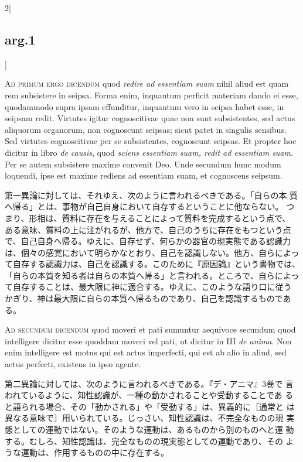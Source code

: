 \documentclass[paper=a4paper,fontsize=10pt,jafontsize=9pt,titlepage]{jlreq}
\begin{document}
\begin{paracol}{2}[\subsection{arg.1}]
\switchcolumn*[\subsection{ad.1}]

{\scshape Ad primum ergo dicendum} quod {\itshape redire ad essentiam
suam} nihil aliud est quam rem subsistere in seipsa. Forma enim,
inquantum perficit materiam dando ei esse, quodammodo supra ipsam
effunditur, inquantum vero in seipsa habet esse, in seipsam
redit. Virtutes igitur cognoscitivae quae non sunt subsistentes, sed
actus aliquorum organorum, non cognoscunt seipsas; sicut patet in
singulis sensibus. Sed virtutes cognoscitivae per se subsistentes,
cognoscunt seipsas. Et propter hoc dicitur in libro {\itshape de
causis}, quod {\itshape sciens essentiam suam, redit ad essentiam
suam}. Per se autem subsistere maxime convenit Deo. Unde secundum hunc
modum loquendi, ipse est maxime rediens ad essentiam suam, et
cognoscens seipsum.

\switchcolumn

第一異論に対しては、それゆえ、次のように言われるべきである。「自らの本
質へ帰る」とは、事物が自己自身において自存するということに他ならない。
つまり、形相は、質料に存在を与えることによって質料を完成するという点で、
ある意味、質料の上に注がれるが、他方で、自己のうちに存在をもつという点
で、自己自身へ帰る。ゆえに、自存せず、何らかの器官の現実態である認識力
は、個々の感覚において明らかなとおり、自己を認識しない。他方、自らによっ
て自存する認識力は、自己を認識する。このために『原因論』という書物では、
「自らの本質を知る者は自らの本質へ帰る」と言われる。ところで、自らによっ
て自存することは、最大限に神に適合する。ゆえに、このような語り口に従う
かぎり、神は最大限に自らの本質へ帰るものであり、自己を認識するものであ
る。

\switchcolumn*[\subsection{ad.2}]

{\scshape Ad secundum dicendum} quod moveri et pati sumuntur aequivoce
secundum quod intelligere dicitur esse quoddam moveri vel pati, ut
dicitur in III {\itshape de anima}. Non enim intelligere est motus qui
est actus imperfecti, qui est ab alio in aliud, sed actus perfecti,
existens in ipso agente.

\switchcolumn

第二異論に対しては、次のように言われるべきである。『デ・アニマ』3巻で
言われているように、知性認識が、一種の動かされることや受動することであ
ると語られる場合、その「動かされる」や「受動する」は、異義的に［通常と
は異なる意味で］用いられている。じっさい、知性認識は、不完全なものの現
実態としての運動ではない。そのような運動は、あるものから別のものへと運
動する。むしろ、知性認識は、完全なものの現実態としての運動であり、その
ような運動は、作用するものの中に存在する。


\end{paracol}
\end{document}
